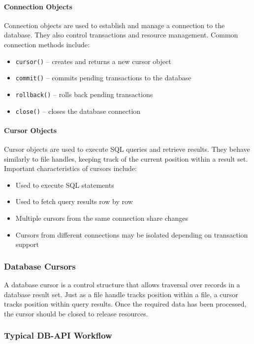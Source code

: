 \documentclass{article}
\begin{document}
\paragraph{Connection Objects}
Connection objects are used to establish and manage a connection to the database.  
They also control transactions and resource management.
Common connection methods include:
\begin{itemize}
    \item \texttt{cursor()} – creates and returns a new cursor object
    \item \texttt{commit()} – commits pending transactions to the database
    \item \texttt{rollback()} – rolls back pending transactions
    \item \texttt{close()} – closes the database connection
\end{itemize}

\paragraph{Cursor Objects}
Cursor objects are used to execute SQL queries and retrieve results.  
They behave similarly to file handles, keeping track of the current position within a result set.
Important characteristics of cursors include:
\begin{itemize}
    \item Used to execute SQL statements
    \item Used to fetch query results row by row
    \item Multiple cursors from the same connection share changes
    \item Cursors from different connections may be isolated depending on transaction support
\end{itemize}

\subsubsection{Database Cursors}

A database cursor is a control structure that allows traversal over records in a database result set.  
Just as a file handle tracks position within a file, a cursor tracks position within query results.  
Once the required data has been processed, the cursor should be closed to release resources.

\subsubsection{Typical DB-API Workflow}
\end{document}
